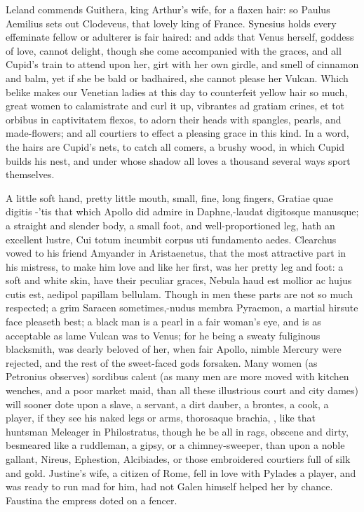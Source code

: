 Leland commends Guithera, king Arthur's wife, for a flaxen hair: so
Paulus Aemilius sets out Clodeveus, that lovely king of France.
Synesius holds every effeminate fellow or adulterer is fair
haired: and \Apuleius adds that Venus herself, goddess of love, cannot
delight, though she come accompanied with the graces, and all
Cupid's train to attend upon her, girt with her own girdle, and smell
of cinnamon and balm, yet if she be bald or badhaired, she cannot
please her Vulcan. Which belike makes our Venetian ladies at this day
to counterfeit yellow hair so much, great women to calamistrate and
curl it up, vibrantes ad gratiam crines, et tot orbibus in captivitatem
flexos, to adorn their heads with spangles, pearls, and made-flowers;
and all courtiers to effect a pleasing grace in this kind. In a word,
the hairs are Cupid's nets, to catch all comers, a brushy wood,
in which Cupid builds his nest, and under whose shadow all loves a
thousand several ways sport themselves.

A little soft hand, pretty little mouth, small, fine, long fingers,
Gratiae quae digitis -'tis that which Apollo did admire in
Daphne,-laudat digitosque manusque; a straight and slender body, a
small foot, and well-proportioned leg, hath an excellent lustre,
Cui totum incumbit corpus uti fundamento aedes. Clearchus vowed
to his friend Amyander in Aristaenetus, that the most attractive
part in his mistress, to make him love and like her first, was her
pretty leg and foot: a soft and white skin, \etc{} have their peculiar
graces, Nebula haud est mollior ac hujus cutis est, aedipol
papillam bellulam. Though in men these parts are not so much respected;
a grim Saracen sometimes,-nudus membra Pyracmon, a martial hirsute face
pleaseth best; a black man is a pearl in a fair woman's eye, and is as
acceptable as lame Vulcan was to Venus; for he being a sweaty
fuliginous blacksmith, was dearly beloved of her, when fair Apollo,
nimble Mercury were rejected, and the rest of the sweet-faced gods
forsaken. Many women (as Petronius observes) sordibus calent (as
many men are more moved with kitchen wenches, and a poor market maid,
than all these illustrious court and city dames) will sooner dote upon
a slave, a servant, a dirt dauber, a brontes, a cook, a player, if they
see his naked legs or arms, thorosaque brachia, \etc{}, like that
huntsman Meleager in Philostratus, though he be all in rags, obscene
and dirty, besmeared like a ruddleman, a gipsy, or a chimney-sweeper,
than upon a noble gallant, Nireus, Ephestion, Alcibiades, or those
embroidered courtiers full of silk and gold. Justine's wife, a
citizen of Rome, fell in love with Pylades a player, and was ready to
run mad for him, had not Galen himself helped her by chance. Faustina
the empress doted on a fencer.

